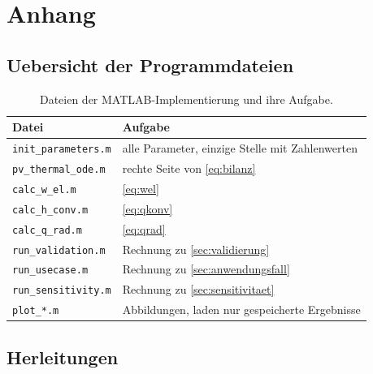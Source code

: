 \section{Anhang}
\label{sec:anhang}

\subsection{Uebersicht der Programmdateien}

\begin{table}[htbp]
  \centering
  \caption{Dateien der MATLAB-Implementierung und ihre Aufgabe.}
  \label{tab:dateien}
  \begin{tabular}{l p{}}
    \toprule
    Datei & Aufgabe \\
    \midrule
    \texttt{init\_parameters.m}     & alle Parameter, einzige Stelle mit Zahlenwerten \\
    \texttt{pv\_thermal\_ode.m}     & rechte Seite von \cref{eq:bilanz} \\
    \texttt{calc\_w\_el.m}          & \cref{eq:wel} \\
    \texttt{calc\_h\_conv.m}        & \cref{eq:qkonv} \\
    \texttt{calc\_q\_rad.m}         & \cref{eq:qrad} \\
    \texttt{run\_validation.m}      & Rechnung zu \cref{sec:validierung} \\
    \texttt{run\_usecase.m}         & Rechnung zu \cref{sec:anwendungsfall} \\
    \texttt{run\_sensitivity.m}     & Rechnung zu \cref{sec:sensitivitaet} \\
    \texttt{plot\_*.m}              & Abbildungen, laden nur gespeicherte Ergebnisse \\
    \bottomrule
  \end{tabular}
\end{table}

\subsection{Herleitungen}
